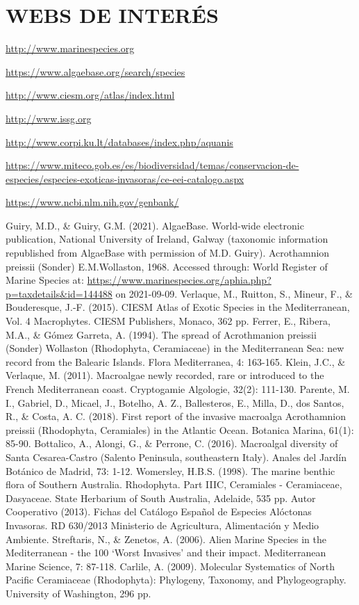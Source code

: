 \documentclass{article}
\begin{document}
\section*{WEBS DE INTERÉS}
\url{http://www.marinespecies.org}
\par
\url{https://www.algaebase.org/search/species}
\par
\url{http://www.ciesm.org/atlas/index.html}
\par
\url{http://www.issg.org}
\par
\url{http://www.corpi.ku.lt/databases/index.php/aquanis}
\par
\url{https://www.miteco.gob.es/es/biodiversidad/temas/conservacion-de-especies/especies-exoticas-invasoras/ce-eei-catalogo.aspx}
\par
\url{https://www.ncbi.nlm.nih.gov/genbank/}

\begin{thebibliography}{18}
 Guiry, M.D., \& Guiry, G.M. (2021). AlgaeBase. World-wide electronic publication, National University of Ireland, Galway (taxonomic information republished from AlgaeBase with permission of M.D. Guiry). Acrothamnion preissii (Sonder) E.M.Wollaston, 1968. Accessed through: World Register of Marine Species at: \url{https://www.marinespecies.org/aphia.php?p=taxdetails&id=144488} on 2021-09-09.
  Verlaque, M., Ruitton, S., Mineur, F., \& Bouderesque, J.-F. (2015). CIESM Atlas of Exotic Species in the Mediterranean, Vol. 4 Macrophytes. CIESM Publishers, Monaco, 362 pp.
 Ferrer, E., Ribera, M.A., \& Gómez Garreta, A. (1994). The spread of Acrothmanion preissii (Sonder) Wollaston (Rhodophyta, Ceramiaceae) in the Mediterranean Sea: new record from the Balearic Islands. Flora Mediterranea, 4: 163-165.
 Klein, J.C., \& Verlaque, M. (2011). Macroalgae newly recorded, rare or introduced to the French Mediterranean coast. Cryptogamie Algologie, 32(2): 111-130.
 Parente, M. I., Gabriel, D., Micael, J., Botelho, A. Z., Ballesteros, E., Milla, D., dos Santos, R., \& Costa, A. C. (2018). First report of the invasive macroalga Acrothamnion preissii (Rhodophyta, Ceramiales) in the Atlantic Ocean. Botanica Marina, 61(1): 85-90. 
 Bottalico, A., Alongi, G., \& Perrone, C. (2016). Macroalgal diversity of Santa Cesarea-Castro (Salento Peninsula, southeastern Italy). Anales del Jardín Botánico de Madrid, 73: 1-12.
 Womersley, H.B.S. (1998). The marine benthic flora of Southern Australia. Rhodophyta. Part IIIC, Ceramiales - Ceramiaceae, Dasyaceae. State Herbarium of South Australia, Adelaide, 535 pp.
 Autor Cooperativo (2013). Fichas del Catálogo Español de Especies Alóctonas Invasoras. RD 630/2013 Ministerio de Agricultura, Alimentación y Medio Ambiente.
 Streftaris, N., \& Zenetos, A. (2006). Alien  Marine Species in the Mediterranean - the 100 ‘Worst Invasives’ and their impact. Mediterranean Marine Science, 7: 87-118. 
 Carlile, A. (2009). Molecular Systematics of North Pacific Ceramiaceae (Rhodophyta): Phylogeny, Taxonomy, and Phylogeography. University of Washington, 296 pp.
\end{thebibliography}
\end{document}
